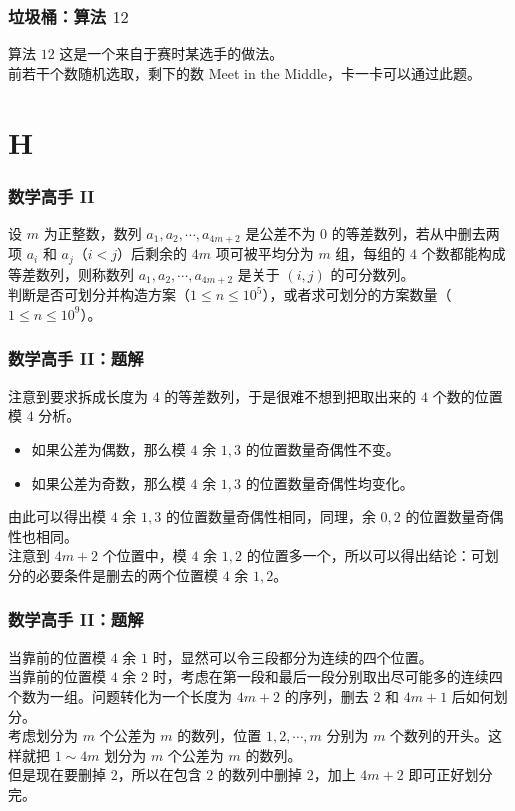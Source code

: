 \documentclass{beamer}
\begin{document}
\begin{frame}
\frametitle{垃圾桶：算法 $12$}
\begin{block}{算法 $12$}
这是一个来自于赛时某选手的做法。\\
前若干个数随机选取，剩下的数 Meet in the Middle，卡一卡可以通过此题。
\end{block}
\end{frame}

\section{H}

\begin{frame}
\frametitle{数学高手 II}
设 $m$ 为正整数，数列 $a_1,a_2,\cdots,a_{4m+2}$ 是公差不为 $0$ 的等差数列，若从中删去两项 $a_i$ 和 $a_j$（$i < j$）后剩余的 $4m$ 项可被平均分为 $m$ 组，每组的 $4$ 个数都能构成等差数列，则称数列 $a_1,a_2,\cdots,a_{4m+2}$ 是关于 $(i,j)$ 的可分数列。\\
判断是否可划分并构造方案（$1 \leq n \leq 10^5$），或者求可划分的方案数量（$1 \leq n \leq 10^9$）。
\end{frame}

\begin{frame}
\frametitle{数学高手 II：题解}
注意到要求拆成长度为 $4$ 的等差数列，于是很难不想到把取出来的 $4$ 个数的位置模 $4$ 分析。\\
\pause
\begin{itemize}
\item 如果公差为偶数，那么模 $4$ 余 $1,3$ 的位置数量奇偶性不变。
\pause
\item 如果公差为奇数，那么模 $4$ 余 $1,3$ 的位置数量奇偶性均变化。
\end{itemize}
\pause
由此可以得出模 $4$ 余 $1,3$ 的位置数量奇偶性相同，同理，余 $0,2$ 的位置数量奇偶性也相同。\\
\pause
注意到 $4m+2$ 个位置中，模 $4$ 余 $1,2$ 的位置多一个，所以可以得出结论：可划分的必要条件是删去的两个位置模 $4$ 余 $1,2$。
\end{frame}

\begin{frame}
\frametitle{数学高手 II：题解}
当靠前的位置模 $4$ 余 $1$ 时，显然可以令三段都分为连续的四个位置。\\
\pause
当靠前的位置模 $4$ 余 $2$ 时，考虑在第一段和最后一段分别取出尽可能多的连续四个数为一组。问题转化为一个长度为 $4m+2$ 的序列，删去 $2$ 和 $4m+1$ 后如何划分。\\
\pause
考虑划分为 $m$ 个公差为 $m$ 的数列，位置 $1,2,\cdots,m$ 分别为 $m$ 个数列的开头。这样就把 $1 \sim 4m$ 划分为 $m$ 个公差为 $m$ 的数列。\\
\pause
但是现在要删掉 $2$，所以在包含 $2$ 的数列中删掉 $2$，加上 $4m+2$ 即可正好划分完。
\end{frame}
\end{document}
